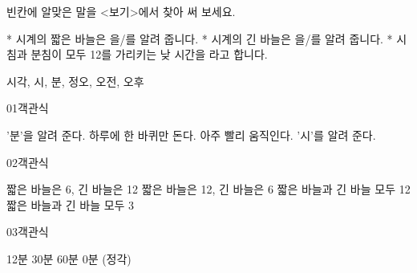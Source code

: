 \documentclass[fs13,seriesSau]{korfarm-base}
\begin{document}
\kfActivityBg \par{}\par\nopagebreak[4]\smallskip\nopagebreak[4]
\begin{kfBlankList}
\kfBlankItem 빈칸에 알맞은 말을 <보기>에서 찾아 써 보세요.

* 시계의 짧은 바늘은 \kfFillBlank[42mm]{}을/를 알려 줍니다. * 시계의 긴 바늘은 \kfFillBlank[42mm]{}을/를 알려 줍니다. * 시침과 분침이 모두 12를 가리키는 낮 시간을 \kfFillBlank[42mm]{}라고 합니다.
\begin{kfEvidence}시각, 시, 분, 정오, 오전, 오후\end{kfEvidence}
\end{kfBlankList}

\kfActivityBg \par{}\par\nopagebreak[4]\smallskip\nopagebreak[4]


\begin{kfQBlock}{01}{객관식}
\begin{kfChoices}
\kfChoice '분'을 알려 준다.
\kfChoice 하루에 한 바퀴만 돈다.
\kfChoice 아주 빨리 움직인다.
\kfChoice '시'를 알려 준다.
\end{kfChoices}
\end{kfQBlock}
\begin{kfQBlock}{02}{객관식}
\begin{kfChoices}
\kfChoice 짧은 바늘은 6, 긴 바늘은 12
\kfChoice 짧은 바늘은 12, 긴 바늘은 6
\kfChoice 짧은 바늘과 긴 바늘 모두 12
\kfChoice 짧은 바늘과 긴 바늘 모두 3
\end{kfChoices}
\end{kfQBlock}
\begin{kfQBlock}{03}{객관식}
\begin{kfChoices}
\kfChoice 12분
\kfChoice 30분
\kfChoice 60분
\kfChoice 0분 (정각)
\end{kfChoices}
\end{kfQBlock}
\end{document}
